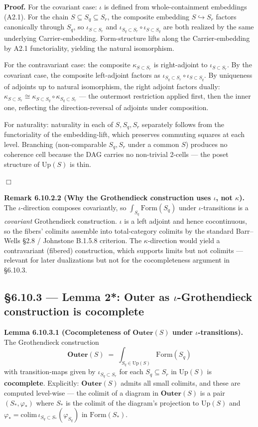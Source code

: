 \documentclass[11pt, openany]{book}
\begin{document}
\textbf{Proof.} For the covariant case: $\iota$ is defined from whole-containment embeddings (A2.1). For the chain $S \subseteq S_q \subseteq S_r$, the composite embedding $S \hookrightarrow S_r$ factors canonically through $S_q$, so $\iota_{S \subset S_r}$ and $\iota_{S_q \subset S_r} \circ \iota_{S \subset S_q}$ are both realized by the same underlying Carrier-embedding. Form-structure lifts along the Carrier-embedding by A2.1 functoriality, yielding the natural isomorphism.

For the contravariant case: the composite $\kappa_{S \subset S_r}$ is right-adjoint to $\iota_{S \subset S_r}$. By the covariant case, the composite left-adjoint factors as $\iota_{S_q \subset S_r} \circ \iota_{S \subset S_q}$. By uniqueness of adjoints up to natural isomorphism, the right adjoint factors dually: $\kappa_{S \subset S_r} \cong \kappa_{S \subset S_q} \circ \kappa_{S_q \subset S_r}$ --- the outermost restriction applied first, then the inner one, reflecting the direction-reversal of adjoints under composition.

For naturality: naturality in each of $S, S_q, S_r$ separately follows from the functoriality of the embedding-lift, which preserves commuting squares at each level. Branching (non-comparable $S_q, S_r$ under a common $S$) produces no coherence cell because the DAG carries no non-trivial 2-cells --- the poset structure of $\mathrm{Up}(S)$ is thin.

$\Box$

\textbf{Remark 6.10.2.2 (Why the Grothendieck construction uses $\iota$, not $\kappa$).} The $\iota$-direction composes covariantly, so $\int_{S_q} \mathrm{Form}(S_q)$ under $\iota$-transitions is a \textit{covariant} Grothendieck construction. $\iota$ is a left adjoint and hence cocontinuous, so the fibers' colimits assemble into total-category colimits by the standard Barr–Wells §2.8 / Johnstone B.1.5.8 criterion. The $\kappa$-direction would yield a contravariant (fibered) construction, which supports limits but not colimits --- relevant for later dualizations but not for the cocompleteness argument in §6.10.3.

\subsection{§6.10.3 --- Lemma 2*: Outer as $\iota$-Grothendieck construction is cocomplete}

\textbf{Lemma 6.10.3.1 (Cocompleteness of $\mathbf{Outer}(S)$ under $\iota$-transitions).} The Grothendieck construction
\[
\mathbf{Outer}(S) \;=\; \int_{S_q \in \mathrm{Up}(S)} \mathrm{Form}(S_q)
\]
with transition-maps given by $\iota_{S_q \subset S_r}$ for each $S_q \subseteq S_r$ in $\mathrm{Up}(S)$ is \textbf{cocomplete}. Explicitly: $\mathbf{Outer}(S)$ admits all small colimits, and these are computed level-wise --- the colimit of a diagram in $\mathbf{Outer}(S)$ is a pair $(S_*, \varphi_*)$ where $S_*$ is the colimit of the diagram's projection to $\mathrm{Up}(S)$ and $\varphi_* = \mathrm{colim}\, \iota_{S_q \subset S_*}(\varphi_{S_q})$ in $\mathrm{Form}(S_*)$.
\end{document}
